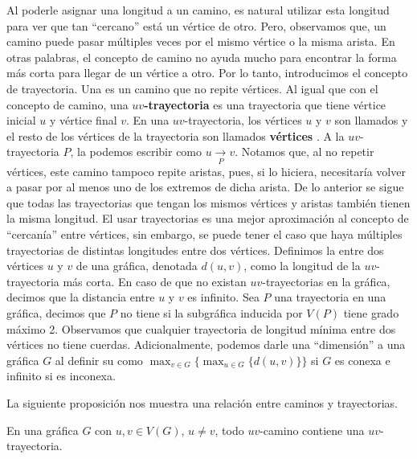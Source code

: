 Al poderle asignar una longitud a un camino, es natural utilizar esta longitud
para ver que tan ``cercano'' est\'a un v\'ertice de otro. Pero, observamos que,
un camino puede pasar m\'ultiples veces por el mismo v\'ertice o la misma
arista. En otras palabras, el concepto de camino no ayuda mucho para encontrar
la forma m\'as corta para llegar de un v\'ertice a otro. Por lo tanto,
introducimos el concepto de trayectoria. Una  es un camino
que no repite v\'ertices. Al igual que con el concepto de camino, una
$uv$\textbf{-trayectoria}  es una trayectoria que
tiene v\'ertice inicial $u$ y v\'ertice final $v$. En una $uv$-trayectoria, los
v\'ertices $u$ y $v$ son llamados  y el resto de
los v\'ertices de la trayectoria son llamados \textbf{v\'ertices}
. A la $uv$-trayectoria $P$, la podemos escribir
como $u\xrightarrow[P]{} v$. Notamos que, al no repetir v\'ertices, este camino
tampoco repite aristas, pues, si lo hiciera, necesitar\'ia volver a pasar por al
menos uno de los extremos de dicha arista. De lo anterior se sigue que todas las
trayectorias que tengan los mismos v\'ertices y aristas tambi\'en tienen la
misma longitud. El usar trayectorias es una mejor aproximaci\'on al concepto de
``cercan\'ia'' entre v\'ertices, sin embargo, se puede tener el caso que haya
m\'ultiples trayectorias de distintas longitudes entre dos v\'ertices. Definimos
la  entre dos v\'ertices $u$ y $v$ de una gr\'afica, denotada
$d(u,v)$, como la longitud de la $uv$-trayectoria m\'as corta. En caso de que no
existan $uv$-trayectorias en la gr\'afica, decimos que la distancia entre $u$ y
$v$ es infinito. Sea $P$ una trayectoria en una gr\'afica, decimos que $P$ no
tiene  si la subgr\'afica inducida por $V(P)$ tiene grado
m\'aximo 2. Observamos que cualquier trayectoria de longitud m\'inima entre dos
v\'ertices no tiene cuerdas. Adicionalmente, podemos darle una ``dimensi\'on'' a
una gr\'afica $G$ al definir su  como $\max_{v\in
G}\{\max_{u\in G}\{d(u,v)\}\}$ si $G$ es conexa e infinito si es inconexa. 

La siguiente proposici\'on nos muestra una relaci\'on entre caminos y
trayectorias.

\begin{proposicion}
\label{prop:CamTray}
    En una gr\'afica $G$ con $u, v \in V(G)$, $u \ne v$, todo $uv$-camino
    contiene una $uv$-trayectoria.
\end{proposicion}

